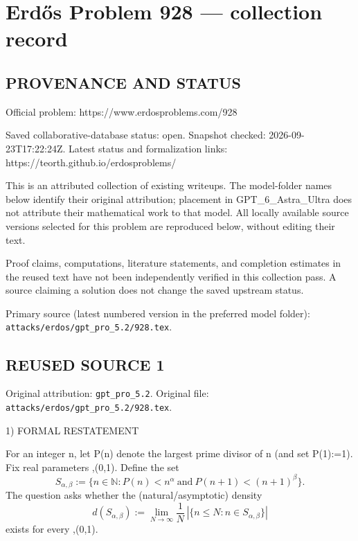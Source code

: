 \section*{Erd\H{o}s Problem 928 --- collection record}

\subsection*{PROVENANCE AND STATUS}
Official problem: https://www.erdosproblems.com/928

Saved collaborative-database status: open.
Snapshot checked: 2026-09-23T17:22:24Z.
Latest status and formalization links: https://teorth.github.io/erdosproblems/

This is an attributed collection of existing writeups. The model-folder names below identify their original attribution; placement in GPT\_6\_Astra\_Ultra does not attribute their mathematical work to that model. All locally available source versions selected for this problem are reproduced below, without editing their text.

Proof claims, computations, literature statements, and completion estimates in the reused text have not been independently verified in this collection pass. A source claiming a solution does not change the saved upstream status.

Primary source (latest numbered version in the preferred model folder): \texttt{attacks/erdos/gpt\_pro\_5.2/928.tex}.

\subsection*{REUSED SOURCE 1}
Original attribution: \texttt{gpt\_pro\_5.2}.
Original file: \texttt{attacks/erdos/gpt\_pro\_5.2/928.tex}.


1) FORMAL RESTATEMENT

For an integer n, let P(n) denote the largest prime divisor of n (and set P(1):=1).
Fix real parameters \alpha,\beta\in(0,1).
Define the set
\[ S_{\alpha,\beta} := \{n\in\mathbb N: P(n) < n^{\alpha}\ \text{and}\ P(n+1) < (n+1)^{\beta}\}. \]
The question asks whether the (natural/asymptotic) density
\[ d(S_{\alpha,\beta}) := \lim_{N\to\infty} \frac{1}{N}\, |\{n\le N: n\in S_{\alpha,\beta}\}| \]
exists for every \alpha,\beta\in(0,1).



